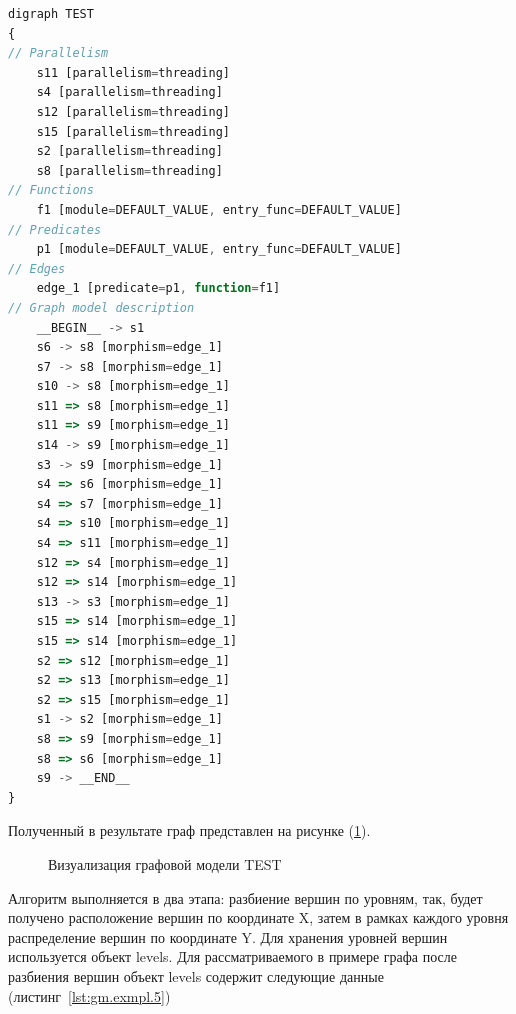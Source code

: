 \begin{lstlisting}[label={lst:gm.exmpl.4}, caption={Пример aDOT-определения графовой модели \textsf{TEST}}, language=JavaScript]
digraph TEST
{
// Parallelism
    s11 [parallelism=threading]
    s4 [parallelism=threading]
    s12 [parallelism=threading]
    s15 [parallelism=threading]
    s2 [parallelism=threading]
    s8 [parallelism=threading]
// Functions
    f1 [module=DEFAULT_VALUE, entry_func=DEFAULT_VALUE]
// Predicates
    p1 [module=DEFAULT_VALUE, entry_func=DEFAULT_VALUE]
// Edges
    edge_1 [predicate=p1, function=f1]
// Graph model description
    __BEGIN__ -> s1
    s6 -> s8 [morphism=edge_1]
    s7 -> s8 [morphism=edge_1]
    s10 -> s8 [morphism=edge_1]
    s11 => s8 [morphism=edge_1]
    s11 => s9 [morphism=edge_1]
    s14 -> s9 [morphism=edge_1]
    s3 -> s9 [morphism=edge_1]
    s4 => s6 [morphism=edge_1]
    s4 => s7 [morphism=edge_1]
    s4 => s10 [morphism=edge_1]
    s4 => s11 [morphism=edge_1]
    s12 => s4 [morphism=edge_1]
    s12 => s14 [morphism=edge_1]
    s13 -> s3 [morphism=edge_1]
    s15 => s14 [morphism=edge_1]
    s15 => s14 [morphism=edge_1]
    s2 => s12 [morphism=edge_1]
    s2 => s13 [morphism=edge_1]
    s2 => s15 [morphism=edge_1]
    s1 -> s2 [morphism=edge_1]
    s8 => s9 [morphism=edge_1]
    s8 => s6 [morphism=edge_1]
    s9 -> __END__ 
}
\end{lstlisting}

Полученный в результате граф представлен на рисунке (\ref{fig:main_graph}).
\begin{figure}[ht!]
\caption{Визуализация графовой модели \textsf{TEST}}
\label{fig:main_graph}
\end{figure}

Алгоритм выполняется в два этапа: разбиение вершин по уровням, так, будет получено расположение вершин по координате X, затем в рамках каждого уровня распределение вершин по координате Y. Для хранения уровней вершин используется объект levels. Для рассматриваемого в примере графа после разбиения вершин объект levels содержит следующие данные (листинг~\ref{lst:gm.exmpl.5})

